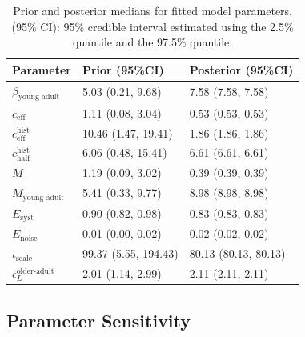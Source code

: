 \documentclass[11pt,twoside]{bristolthesis}
\begin{document}
  \begin{longtable}{lll}
  \caption[Prior and posterior medians for fitted model parameters]{\label{tab:09-prior-posterior}Prior and posterior medians for fitted model parameters. (95\% CI): 95\% credible interval estimated using the 2.5\% quantile and the 97.5\% quantile.}\\
  \toprule
  Parameter & Prior (95\%CI) & Posterior (95\%CI)\\
  \midrule
  $\beta_{\text{young adult}}$ & 5.03 (0.21, 9.68) & 7.58 (7.58, 7.58)\\
  $c_{\text{eff}}$ & 1.11 (0.08, 3.04) & 0.53 (0.53, 0.53)\\
  $c^{\text{hist}}_{\text{eff}}$ & 10.46 (1.47, 19.41) & 1.86 (1.86, 1.86)\\
  $c^{\text{hist}}_{\text{half}}$ & 6.06 (0.48, 15.41) & 6.61 (6.61, 6.61)\\
  $M$ & 1.19 (0.09, 3.02) & 0.39 (0.39, 0.39)\\
  \addlinespace
  $M_{\text{young adult}}$ & 5.41 (0.33, 9.77) & 8.98 (8.98, 8.98)\\
  $E_{\text{syst}}$ & 0.90 (0.82, 0.98) & 0.83 (0.83, 0.83)\\
  $E_{\text{noise}}$ & 0.01 (0.00, 0.02) & 0.02 (0.02, 0.02)\\
  $\iota_{\text{scale}}$ & 99.37 (5.55, 194.43) & 80.13 (80.13, 80.13)\\
  $\epsilon^{\text{older-adult}}_L$ & 2.01 (1.14, 2.99) & 2.11 (2.11, 2.11)\\
  \bottomrule
  \end{longtable}
  \hypertarget{parameter-sensitivity-1}{%
  \subsection{Parameter Sensitivity}\label{parameter-sensitivity-1}}
  
\end{document}
